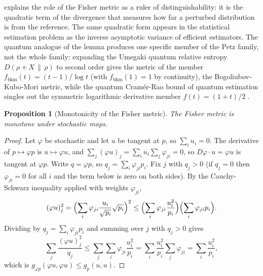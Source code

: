 \documentclass[11pt,letterpaper]{article}
\newtheorem{proposition}[theorem]{Proposition}
\theoremstyle{definition}
\theoremstyle{remark}
\begin{document}
 explains the role of the Fisher metric as a ruler of distinguishability: it is the quadratic term of the divergence that measures how far a perturbed distribution is from the reference. The same quadratic form appears in the statistical estimation problem as the inverse asymptotic variance of efficient estimators. The quantum analogue of the lemma produces one specific member of the Petz family, not the whole family: expanding the Umegaki quantum relative entropy $D(\rho + X \,\|\, \rho)$ to second order gives the metric of the member $f_{\mathrm{bkm}}(t) = (t-1)/\log t$ (with $f_{\mathrm{bkm}}(1) = 1$ by continuity), the Bogoliubov-Kubo-Mori metric, while the quantum Cram\'er-Rao bound of quantum estimation singles out the symmetric logarithmic derivative member $f(t) = (1+t)/2$ \cite{braunstein-caves, petz-1996}.

\begin{proposition}[Monotonicity of the Fisher metric]
\label{prop:monotone}
The Fisher metric is monotone under stochastic maps.
\end{proposition}

\begin{proof}
Let $\varphi$ be stochastic and let $u$ be tangent at $p$, so $\sum_i u_i = 0$. The derivative of $p \mapsto \varphi p$ is $u \mapsto \varphi u$, and $\sum_j (\varphi u)_j = \sum_i u_i \sum_j \varphi_{ji} = 0$, so $D\varphi \cdot u = \varphi u$ is tangent at $\varphi p$. Write $q = \varphi p$, so $q_j = \sum_i \varphi_{ji} p_i$. Fix $j$ with $q_j > 0$ (if $q_j = 0$ then $\varphi_{ji} = 0$ for all $i$ and the term below is zero on both sides). By the Cauchy-Schwarz inequality applied with weights $\varphi_{ji}$,
\begin{equation}
(\varphi u)_j^2 = \Bigl(\sum_i \varphi_{ji} \frac{u_i}{\sqrt{p_i}} \sqrt{p_i}\Bigr)^2
\leq \Bigl(\sum_i \varphi_{ji} \frac{u_i^2}{p_i}\Bigr) \Bigl(\sum_i \varphi_{ji} p_i\Bigr).
\end{equation}
Dividing by $q_j = \sum_i \varphi_{ji} p_i$ and summing over $j$ with $q_j > 0$ gives
\begin{equation}
\sum_j \frac{(\varphi u)_j^2}{q_j}
\leq \sum_j \sum_i \varphi_{ji} \frac{u_i^2}{p_i}
= \sum_i \frac{u_i^2}{p_i} \sum_j \varphi_{ji}
= \sum_i \frac{u_i^2}{p_i},
\end{equation}
which is $g_{\varphi p}(\varphi u, \varphi u) \leq g_p(u, u)$.
\end{proof}
\end{document}
